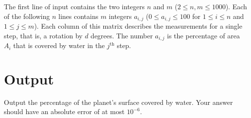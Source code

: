 The first line of input contains the two integers $n$ and $m$ ($2 \leq n, m \leq 1000$).
Each of the following $n$ lines contains $m$ integers $a_{i,j}$ ($0 \leq a_{i,j} \leq 100$ for $1 \leq i \leq n$ and $1 \leq j \leq m$).
Each column of this matrix describes the measurements for a single step, that is, a rotation by $d$ degrees.
The number $a_{i,j}$ is the percentage of area $A_i$ that is covered by water in the $j^\mathrm{th}$ step.

\section*{Output}

Output the percentage of the planet's surface covered by water. Your answer should have an absolute error of at most $10^{-6}$.

